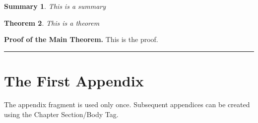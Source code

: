 \documentclass[11pt,spanish]{report}
\newtheorem{theorem}{Theorem}
\newtheorem{summary}[theorem]{Summary}
\newenvironment{proof}[1][Proof]{\textbf{#1.} }{\ \rule{0.5em}{0.5em}}
\begin{document}
\begin{summary}
This is a summary
\end{summary}

\begin{theorem}
This is a theorem
\end{theorem}

\begin{proof}[Proof of the Main Theorem]
This is the proof.
\end{proof}

\appendix

\chapter{The First Appendix}

The appendix fragment is used only once. Subsequent appendices can be
created using the Chapter Section/Body Tag.



\end{document}
